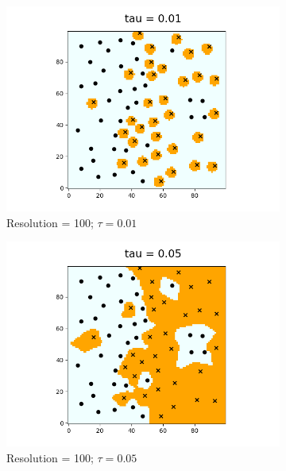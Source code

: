 \documentclass{article}
\begin{document}
\begin{figure}[!htb]
    \center
    \begin{subfigure}{0.3\textwidth}
      \centering
      \includegraphics[width=\linewidth]{res_100_tau_0point01}
      \caption{Resolution = 100; \(\tau = 0.01\) }
      \label{fig:subfig4}
    \end{subfigure}%
    \hfill
    \begin{subfigure}{0.3\textwidth}
      \centering
      \includegraphics[width=\linewidth]{res_100_tau_0point05}
      \caption{Resolution = 100; \(\tau = 0.05\)  }
      \label{fig:subfig5}
    \end{subfigure}%
    \hfill
    \begin{subfigure}{0.3\textwidth}

\end{subfigure}
\end{figure}
\end{document}
